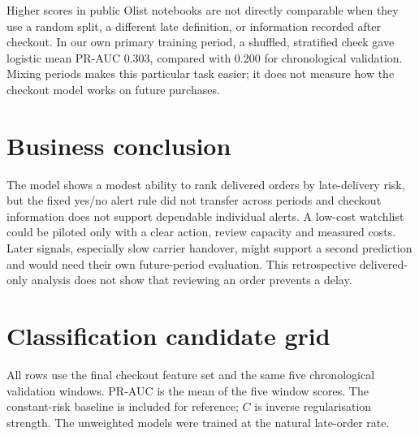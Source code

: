 \documentclass[11pt,a4paper]{article}
\begin{document}
Higher scores in public Olist notebooks are not directly comparable when they use a random split, a different late definition, or information recorded after checkout. In our own primary training period, a shuffled, stratified check gave logistic mean PR-AUC 0.303, compared with 0.200 for chronological validation. Mixing periods makes this particular task easier; it does not measure how the checkout model works on future purchases.

\section*{Business conclusion}
The model shows a modest ability to rank delivered orders by late-delivery risk, but the fixed yes/no alert rule did not transfer across periods and checkout information does not support dependable individual alerts. A low-cost watchlist could be piloted only with a clear action, review capacity and measured costs. Later signals, especially slow carrier handover, might support a second prediction and would need their own future-period evaluation. This retrospective delivered-only analysis does not show that reviewing an order prevents a delay.

\clearpage
\appendix
\section{Classification candidate grid}
\label{app:grid}
All rows use the final checkout feature set and the same five chronological validation windows. PR-AUC is the mean of the five window scores. The constant-risk baseline is included for reference; $C$ is inverse regularisation strength. The unweighted models were trained at the natural late-order rate.
\end{document}
